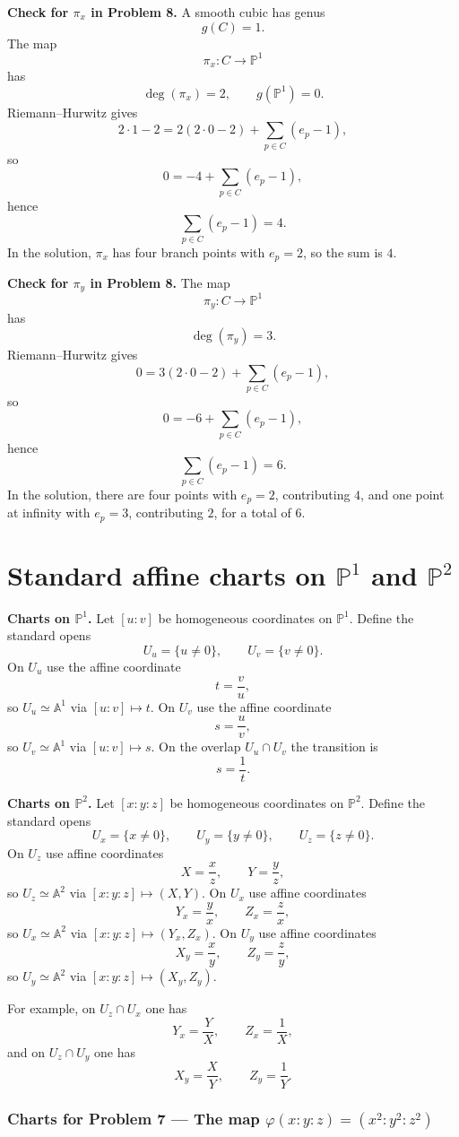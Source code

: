 \documentclass[12pt,a4paper]{article}
\theoremstyle{plain}
\theoremstyle{definition}      %
\begin{document}
\textbf{Check for \(\pi_x\) in Problem 8.}
A smooth cubic has genus
\[
g(C)=1.
\]
The map
\[
\pi_x:C\to \mathbb P^1
\]
has
\[
\deg(\pi_x)=2,
\qquad
g(\mathbb P^1)=0.
\]
Riemann--Hurwitz gives
\[
2\cdot 1-2
=
2(2\cdot 0-2)
+
\sum_{p\in C}(e_p-1),
\]
so
\[
0
=
-4
+
\sum_{p\in C}(e_p-1),
\]
hence
\[
\sum_{p\in C}(e_p-1)=4.
\]
In the solution, \(\pi_x\) has four branch points with \(e_p=2\), so the sum is \(4\).

\textbf{Check for \(\pi_y\) in Problem 8.}
The map
\[
\pi_y:C\to \mathbb P^1
\]
has
\[
\deg(\pi_y)=3.
\]
Riemann--Hurwitz gives
\[
0
=
3(2\cdot 0-2)
+
\sum_{p\in C}(e_p-1),
\]
so
\[
0
=
-6
+
\sum_{p\in C}(e_p-1),
\]
hence
\[
\sum_{p\in C}(e_p-1)=6.
\]
In the solution, there are four points with \(e_p=2\), contributing \(4\), and one point at infinity with \(e_p=3\), contributing \(2\), for a total of \(6\).


\section*{Standard affine charts on \(\mathbb P^1\) and \(\mathbb P^2\)}

\textbf{Charts on \(\mathbb P^1\).}
Let \([u:v]\) be homogeneous coordinates on \(\mathbb P^1\).
Define the standard opens
\[
U_u=\{u\neq 0\},
\qquad
U_v=\{v\neq 0\}.
\]
On \(U_u\) use the affine coordinate
\[
t=\frac{v}{u},
\]
so \(U_u\simeq \mathbb A^1\) via \([u:v]\mapsto t\).
On \(U_v\) use the affine coordinate
\[
s=\frac{u}{v},
\]
so \(U_v\simeq \mathbb A^1\) via \([u:v]\mapsto s\).
On the overlap \(U_u\cap U_v\) the transition is
\[
s=\frac{1}{t}.
\]

\textbf{Charts on \(\mathbb P^2\).}
Let \([x:y:z]\) be homogeneous coordinates on \(\mathbb P^2\).
Define the standard opens
\[
U_x=\{x\neq 0\},
\qquad
U_y=\{y\neq 0\},
\qquad
U_z=\{z\neq 0\}.
\]
On \(U_z\) use affine coordinates
\[
X=\frac{x}{z},
\qquad
Y=\frac{y}{z},
\]
so \(U_z\simeq \mathbb A^2\) via \([x:y:z]\mapsto (X,Y)\).
On \(U_x\) use affine coordinates
\[
Y_x=\frac{y}{x},
\qquad
Z_x=\frac{z}{x},
\]
so \(U_x\simeq \mathbb A^2\) via \([x:y:z]\mapsto (Y_x,Z_x)\).
On \(U_y\) use affine coordinates
\[
X_y=\frac{x}{y},
\qquad
Z_y=\frac{z}{y},
\]
so \(U_y\simeq \mathbb A^2\) via \([x:y:z]\mapsto (X_y,Z_y)\).

For example, on \(U_z\cap U_x\) one has
\[
Y_x=\frac{Y}{X},
\qquad
Z_x=\frac{1}{X},
\]
and on \(U_z\cap U_y\) one has
\[
X_y=\frac{X}{Y},
\qquad
Z_y=\frac{1}{Y}.
\]


\subsubsection*{Charts for Problem 7 — The map \(\varphi(x:y:z)=(x^2:y^2:z^2)\)}
\end{document}
